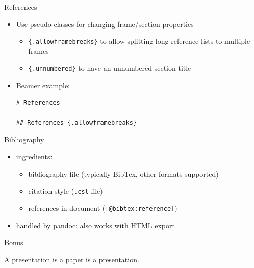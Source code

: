 \documentclass[smaller,ignorenonframetext,]{beamer}
\begin{document}
\begin{frame}[fragile]{References}

\begin{itemize}
\item
  Use pseudo classes for changing frame/section properties

  \begin{itemize}
  \itemsep1pt\parskip0pt
  \item
    \lstinline!{.allowframebreaks}! to allow splitting long reference
    lists to multiple frames
  \item
    \lstinline!{.unnumbered}! to have an unnumbered section title
  \end{itemize}
\item
  Beamer example:

\begin{lstlisting}
# References

## References {.allowframebreaks}
\end{lstlisting}
\end{itemize}

\end{frame}

\begin{frame}[fragile]{Bibliography}

\begin{itemize}
\itemsep1pt\parskip0pt
\item
  ingredients:

  \begin{itemize}
  \itemsep1pt\parskip0pt
  \item
    bibliography file (typically BibTex, other formats supported)
  \item
    citation style (\lstinline!.csl! file)
  \item
    references in document (\lstinline![@bibtex:reference]!)
  \end{itemize}
\item
  handled by pandoc: also works with HTML export
\end{itemize}

\end{frame}

\begin{frame}{Bonus}

\begin{center}\Large
A presentation is a paper is a presentation.
\end{center}

\end{frame}
\end{document}
